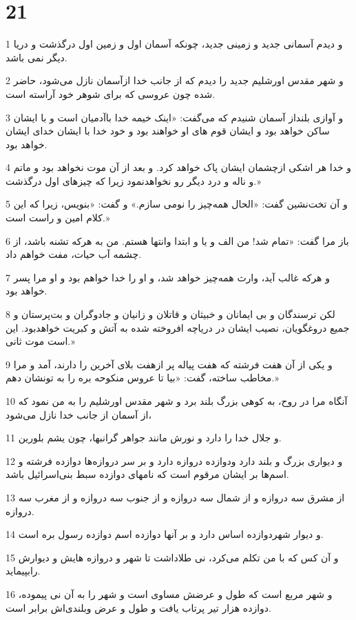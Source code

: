 \chapter{21}

\par 1 و دیدم آسمانی جدید و زمینی جدید، چونکه آسمان اول و زمین اول درگذشت و دریا دیگر نمی باشد.
\par 2 و شهر مقدس اورشلیم جدید را دیدم که از جانب خدا ازآسمان نازل می‌شود، حاضر شده چون عروسی که برای شوهر خود آراسته است.
\par 3 و آوازی بلنداز آسمان شنیدم که می‌گفت: «اینک خیمه خدا باآدمیان است و با ایشان ساکن خواهد بود و ایشان قوم های او خواهند بود و خود خدا با ایشان خدای ایشان خواهد بود.
\par 4 و خدا هر اشکی ازچشمان ایشان پاک خواهد کرد. و بعد از آن موت نخواهد بود و ماتم و ناله و درد دیگر رو نخواهدنمود زیرا که چیزهای اول درگذشت.»
\par 5 و آن تخت‌نشین گفت: «الحال همه‌چیز را نومی سازم.» و گفت: «بنویس، زیرا که این کلام امین و راست است.»
\par 6 باز مرا گفت: «تمام شد! من الف و یا و ابتدا وانتها هستم. من به هر‌که تشنه باشد، از چشمه آب حیات، مفت خواهم داد.
\par 7 و هر‌که غالب آید، وارث همه‌چیز خواهد شد، و او را خدا خواهم بود و او مرا پسر خواهد بود.
\par 8 لکن ترسندگان و بی ایمانان و خبیثان و قاتلان و زانیان و جادوگران و بت‌پرستان و جمیع دروغگویان، نصیب ایشان در دریاچه افروخته شده به آتش و کبریت خواهدبود. این است موت ثانی.»
\par 9 و یکی از آن هفت فرشته که هفت پیاله پر ازهفت بلای آخرین را دارند، آمد و مرا مخاطب ساخته، گفت: «بیا تا عروس منکوحه بره را به تونشان دهم.»
\par 10 آنگاه مرا در روح، به کوهی بزرگ بلند برد و شهر مقدس اورشلیم را به من نمود که از آسمان از جانب خدا نازل می‌شود،
\par 11 و جلال خدا را دارد و نورش مانند جواهر گرانبها، چون یشم بلورین.
\par 12 و دیواری بزرگ و بلند دارد ودوازده دروازه دارد و بر سر دروازه‌ها دوازده فرشته و اسم‌ها بر ایشان مرقوم است که نامهای دوازده سبط بنی‌اسرائیل باشد.
\par 13 از مشرق سه دروازه و از شمال سه دروازه و از جنوب سه دروازه و از مغرب سه دروازه.
\par 14 و دیوار شهردوازده اساس دارد و بر آنها دوازده اسم دوازده رسول بره است.
\par 15 و آن کس که با من تکلم می‌کرد، نی طلاداشت تا شهر و دروازه هایش و دیوارش رابپیماید.
\par 16 و شهر مربع است که طول و عرضش مساوی است و شهر را به آن نی پیموده، دوازده هزار تیر پرتاب یافت و طول و عرض وبلندی‌اش برابر است.
